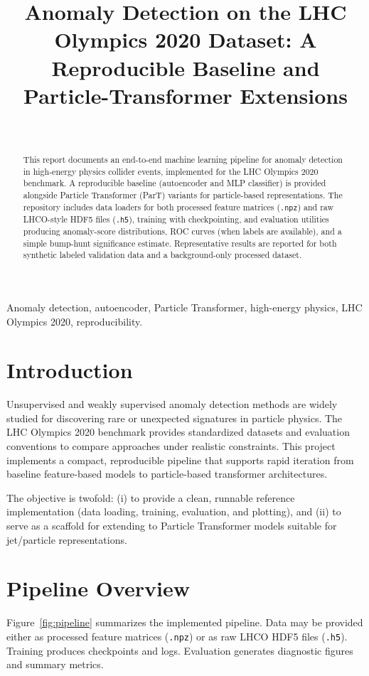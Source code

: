 \documentclass[journal]{IEEEtran}
\title{Anomaly Detection on the LHC Olympics 2020 Dataset: A Reproducible Baseline and Particle-Transformer Extensions}
\author{\IEEEauthorblockN{\textit{(Author Name)}}\\
\IEEEauthorblockA{\textit{Istanbul University, DAMLA LAB}\\}}
\begin{document}
\maketitle

\begin{abstract}
This report documents an end-to-end machine learning pipeline for anomaly detection in high-energy physics collider events, implemented for the LHC Olympics 2020 benchmark. A reproducible baseline (autoencoder and MLP classifier) is provided alongside Particle Transformer (ParT) variants for particle-based representations. The repository includes data loaders for both processed feature matrices (\texttt{.npz}) and raw LHCO-style HDF5 files (\texttt{.h5}), training with checkpointing, and evaluation utilities producing anomaly-score distributions, ROC curves (when labels are available), and a simple bump-hunt significance estimate. Representative results are reported for both synthetic labeled validation data and a background-only processed dataset.
\end{abstract}

\begin{IEEEkeywords}
Anomaly detection, autoencoder, Particle Transformer, high-energy physics, LHC Olympics 2020, reproducibility.
\end{IEEEkeywords}

\section{Introduction}
Unsupervised and weakly supervised anomaly detection methods are widely studied for discovering rare or unexpected signatures in particle physics. The LHC Olympics 2020 benchmark provides standardized datasets and evaluation conventions to compare approaches under realistic constraints. This project implements a compact, reproducible pipeline that supports rapid iteration from baseline feature-based models to particle-based transformer architectures.

The objective is twofold: (i) to provide a clean, runnable reference implementation (data loading, training, evaluation, and plotting), and (ii) to serve as a scaffold for extending to Particle Transformer models suitable for jet/particle representations.

\section{Pipeline Overview}
Figure~\ref{fig:pipeline} summarizes the implemented pipeline. Data may be provided either as processed feature matrices (\texttt{.npz}) or as raw LHCO HDF5 files (\texttt{.h5}). Training produces checkpoints and logs. Evaluation generates diagnostic figures and summary metrics.
\end{document}
